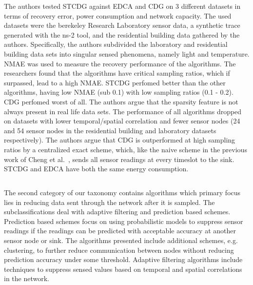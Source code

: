 The authors tested \ac{STCDG} against \ac{EDCA} and \ac{CDG} on 3 different
datasets in terms of recovery error, power consumption and network capacity.
The used datasets were the berekeley Research Laboratory sensor data, a
synthetic trace generated with the ns-2 tool, and the residential building data
gathered by the authors. Specifically, the authors subdivided the laboratory
and residential building data sets into singular sensed phenomena, namely light
and temperature. \ac{NMAE} was used to measure the recovery performance of the
algorithms. The researchers found that the algorithms have critical sampling
ratios, which if surpassed, lead to a high \ac{NMAE}. \ac{STCDG} perfomed
better than the other algorithms, having low \ac{NMAE} (sub 0.1) with low
sampling ratios (0.1 - 0.2). \ac{CDG} perfomed worst of all. The authors argue
that the sparsity feature is not always present in real life data sets. The
performance of all algorithms dropped on datasets with lower temporal/spatial
correlation and fewer sensor nodes (24 and 54 sensor nodes in the residential
building and laboratory datasets respectively). The authors argue that \ac{CDG}
is outperformed at high sampling ratios by a centralized exact scheme, which,
like the naive scheme in the previous work of Cheng et
al.~\cite{cheng2013stcdg}, sends all sensor readings at every timeslot to the
sink. \ac{STCDG} and \ac{EDCA} have both the same energy consumption.


\subsection{\catII} %
\label{sec:catII}

The second category of our taxonomy contains algorithms which primary focus
lies in reducing data sent through the network after it is sampled. The
subclassifications deal with adaptive filtering and prediction based schemes.
Prediction based schemes focus on using probabilistic models to suppress sensor
readings if the readings can be predicted with acceptable accuracy at another
sensor node or sink. The algorithms presented include additional schemes, e.g.
clustering, to further reduce communication between nodes without reducing
prediction accuracy under some threshold. Adaptive filtering algorithms include
techniques to suppress sensed values based on temporal and spatial correlations
in the network.


